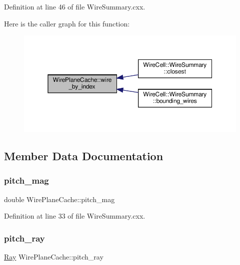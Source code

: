 Definition at line 46 of file Wire\+Summary.\+cxx.

Here is the caller graph for this function\+:
\nopagebreak
\begin{figure}[H]
\begin{center}
\leavevmode
\includegraphics[width=350pt]{struct_wire_plane_cache_a96ab540b1fb5007eabd540fbae44cc62_icgraph}
\end{center}
\end{figure}


\subsection{Member Data Documentation}
\mbox{\label{struct_wire_plane_cache_a41ef8c962616e240a84f5a06e6277d2c}} 
\subsubsection{\texorpdfstring{pitch\+\_\+mag}{pitch\_mag}}
{\footnotesize\ttfamily double Wire\+Plane\+Cache\+::pitch\+\_\+mag}



Definition at line 33 of file Wire\+Summary.\+cxx.

\mbox{\label{struct_wire_plane_cache_a1fcdfd57ba5ad834bb7b71dd9fae6b60}} 
\subsubsection{\texorpdfstring{pitch\+\_\+ray}{pitch\_ray}}
{\footnotesize\ttfamily \hyperlink{namespace_wire_cell_a3ab20d9b438feb7eb1ffaab9ba98af0c}{Ray} Wire\+Plane\+Cache\+::pitch\+\_\+ray}



